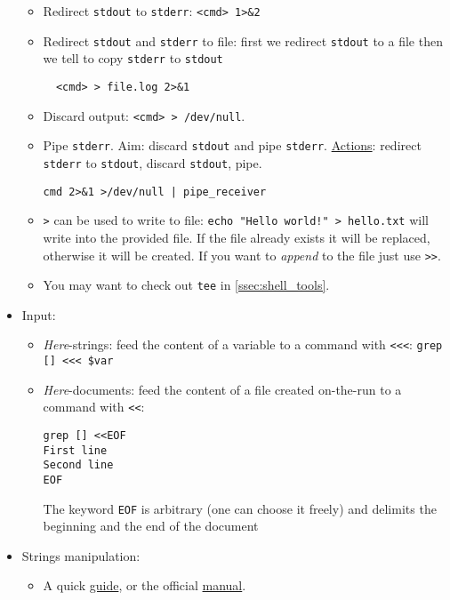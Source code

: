 \documentclass[a4paper,12pt,%
              final%
              ]{article}
\begin{document}
\begin{itemize}
    \begin{itemize}
      \item Redirect \texttt{stdout} to \texttt{stderr}: \verb|<cmd> 1>&2|
      \item Redirect \texttt{stdout} and \texttt{stderr} to file: first we redirect \texttt{stdout} to a file then we tell to copy \texttt{stderr} to \texttt{stdout}
\begin{verbatim}
  <cmd> > file.log 2>&1
\end{verbatim}
      \item Discard output: \texttt{<cmd> > /dev/null}.
      \item Pipe \texttt{stderr}. Aim: discard \texttt{stdout} and pipe \texttt{stderr}. \href{https://stackoverflow.com/questions/2342826/how-can-i-pipe-stderr-and-not-stdout}{Actions}: redirect \texttt{stderr} to \texttt{stdout}, discard \texttt{stdout}, pipe.
\begin{verbatim}
cmd 2>&1 >/dev/null | pipe_receiver
\end{verbatim}
      \item \verb|>| can be used to write to file: \verb|echo "Hello world!" > hello.txt| will write into the provided file. If the file already exists it will be replaced, otherwise it will be created. If you want to \emph{append} to the file just use \verb|>>|.
      \item You may want to check out \texttt{tee} in \ref{ssec:shell_tools}.
    \end{itemize}
  \item Input:
    \begin{itemize}
      \item \emph{Here}-strings: feed the content of a variable to a command with \verb|<<<|: \verb|grep [] <<< $var|
      \item \emph{Here}-documents: feed the content of a file created on-the-run to a command with  \verb|<<|:
\begin{verbatim}
grep [] <<EOF
First line
Second line
EOF
\end{verbatim}
        The keyword \texttt{EOF} is arbitrary (one can choose it freely) and delimits the beginning and the end of the document
    \end{itemize}
  \item Strings manipulation:
    \begin{itemize}
      \item A quick \href{https://sookocheff.com/post/bash/bash-string-operators/}{guide}, or the official \href{https://www.gnu.org/software/bash/manual/html_node/Shell-Parameter-Expansion.html}{manual}.

\end{itemize}
\end{itemize}
\end{document}
